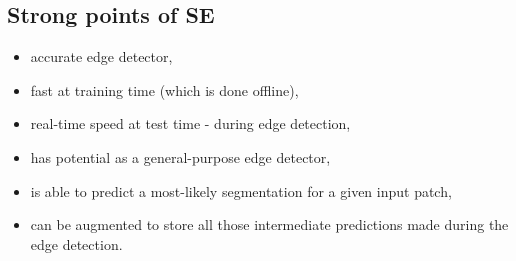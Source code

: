\subsection*{Strong points of SE}

\begin{itemize}
 \item accurate edge detector,
 \item fast at training time (which is done offline),
 \item real-time speed at test time - during edge detection,
 \item has potential as a general-purpose edge detector, %
 \item is able to predict a most-likely segmentation for a given input patch,
 \item can be augmented to store all those intermediate predictions made during the edge detection.
\end{itemize}

